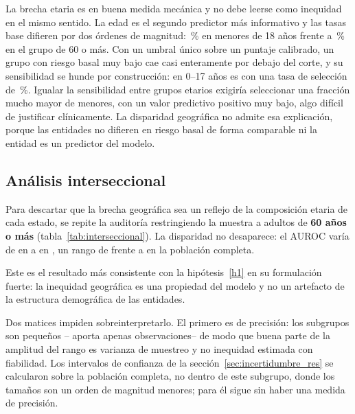 


La brecha etaria es en buena medida mecánica y no debe leerse como inequidad en el
mismo sentido. La edad es el segundo predictor más informativo y las tasas base
difieren por dos órdenes de magnitud: \edadMenorTasa\,\% en menores de 18 años
frente a \edadMayorTasa\,\% en el grupo de 60 o más. Con un umbral único sobre un puntaje calibrado,
un grupo con riesgo basal muy bajo cae casi enteramente por debajo del corte, y su
sensibilidad se hunde por construcción: en 0--17 años es \edadMenorTPR{} con una
tasa de selección de \edadMenorSel\,\%. Igualar la sensibilidad entre grupos etarios exigiría
seleccionar una fracción mucho mayor de menores, con un valor predictivo positivo
muy bajo, algo difícil de justificar clínicamente. La disparidad geográfica no
admite esa explicación, porque las entidades no difieren en riesgo basal de forma
comparable ni la entidad es un predictor del modelo.

\subsection{Análisis interseccional}
\label{sec:interseccional}

Para descartar que la brecha geográfica sea un reflejo de la composición etaria de
cada estado, se repite la auditoría restringiendo la muestra a adultos de
\textbf{60 años o más} (tabla~\ref{tab:interseccional}). La disparidad no
desaparece: el AUROC varía de \sesentaPeorAUROC{} en \sesentaPeor{} a
\sesentaMejorAUROC{} en \sesentaMejor, un rango de \sesentaRango{} frente a
\gapAUROCentidad{} en la población completa.



Este es el resultado más consistente con la hipótesis~\ref{h1} en su formulación
fuerte: la inequidad geográfica es una propiedad del modelo y no un artefacto de
la estructura demográfica de las entidades.

Dos matices impiden sobreinterpretarlo. El primero es de precisión: los subgrupos
son pequeños --\sesentaPeor{} aporta apenas \sesentaPeorN{} observaciones-- de
modo que buena parte de la amplitud del rango es varianza de muestreo y no
inequidad estimada con fiabilidad. Los intervalos de confianza de la
sección~\ref{sec:incertidumbre_res} se calcularon sobre la población completa, no
dentro de este subgrupo, donde los tamaños son un orden de magnitud menores; para
él sigue sin haber una medida de precisión.

